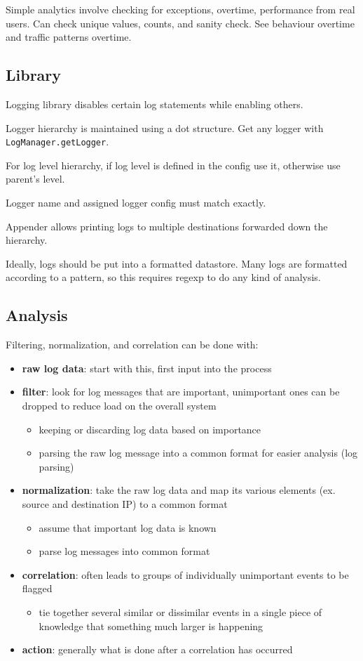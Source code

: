 \documentclass[11pt]{article}
\begin{document}
Simple analytics involve checking for exceptions, overtime, performance from real users.
Can check unique values, counts, and sanity check.
See behaviour overtime and traffic patterns overtime.
\subsection{Library}
\label{sec:org6d31c39}
Logging library disables certain log statements while enabling others.

Logger hierarchy is maintained using a dot structure.
Get any logger with \texttt{LogManager.getLogger}.

For log level hierarchy, if log level is defined in the config use it, otherwise use parent's level.

Logger name and assigned logger config must match exactly.

Appender allows printing logs to multiple destinations forwarded down the hierarchy.

Ideally, logs should be put into a formatted datastore.
Many logs are formatted according to a pattern, so this requires regexp to do any kind of analysis.
\subsection{Analysis}
\label{sec:org4fd1fca}
Filtering, normalization, and correlation can be done with:
\begin{itemize}
\item \textbf{raw log data}: start with this, first input into the process
\item \textbf{filter}: look for log messages that are important, unimportant ones can be dropped to reduce load
on the overall system
\begin{itemize}
\item keeping or discarding log data based on importance
\item parsing the raw log message into a common format for easier analysis (log parsing)
\end{itemize}
\item \textbf{normalization}: take the raw log data and map its various elements (ex. source and destination IP)
to a common format
\begin{itemize}
\item assume that important log data is known
\item parse log messages into common format
\end{itemize}
\item \textbf{correlation}: often leads to groups of individually unimportant events to be flagged
\begin{itemize}
\item tie together several similar or dissimilar events in a single piece of knowledge that something
much larger is happening
\end{itemize}
\item \textbf{action}: generally what is done after a correlation has occurred
\end{itemize}
\end{document}

